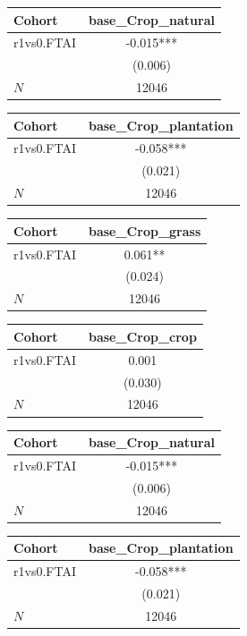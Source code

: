 {
\def\sym#1{\ifmmode^{#1}\else\(^{#1}\)\fi}
\begin{tabular}{l*{1}{c}}
\toprule
Cohort    &base\_Crop\_natural   \\
\midrule
r1vs0.FTAI&   -0.015***\\
          &  (0.006)   \\
\midrule
\(N\)     &    12046   \\
\bottomrule
\end{tabular}
}
{
\def\sym#1{\ifmmode^{#1}\else\(^{#1}\)\fi}
\begin{tabular}{l*{1}{c}}
\toprule
Cohort    &base\_Crop\_plantation   \\
\midrule
r1vs0.FTAI&   -0.058***\\
          &  (0.021)   \\
\midrule
\(N\)     &    12046   \\
\bottomrule
\end{tabular}
}
{
\def\sym#1{\ifmmode^{#1}\else\(^{#1}\)\fi}
\begin{tabular}{l*{1}{c}}
\toprule
Cohort    &base\_Crop\_grass   \\
\midrule
r1vs0.FTAI&    0.061** \\
          &  (0.024)   \\
\midrule
\(N\)     &    12046   \\
\bottomrule
\end{tabular}
}
{
\def\sym#1{\ifmmode^{#1}\else\(^{#1}\)\fi}
\begin{tabular}{l*{1}{c}}
\toprule
Cohort    &base\_Crop\_crop   \\
\midrule
r1vs0.FTAI&    0.001   \\
          &  (0.030)   \\
\midrule
\(N\)     &    12046   \\
\bottomrule
\end{tabular}
}
{
\def\sym#1{\ifmmode^{#1}\else\(^{#1}\)\fi}
\begin{tabular}{l*{1}{c}}
\toprule
Cohort    &base\_Crop\_natural   \\
\midrule
r1vs0.FTAI&   -0.015***\\
          &  (0.006)   \\
\midrule
\(N\)     &    12046   \\
\bottomrule
\end{tabular}
}
{
\def\sym#1{\ifmmode^{#1}\else\(^{#1}\)\fi}
\begin{tabular}{l*{1}{c}}
\toprule
Cohort    &base\_Crop\_plantation   \\
\midrule
r1vs0.FTAI&   -0.058***\\
          &  (0.021)   \\
\midrule
\(N\)     &    12046   \\
\bottomrule
\end{tabular}
}
